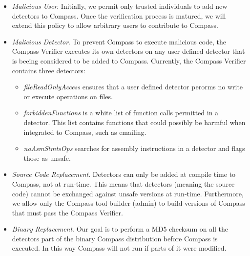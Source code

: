\begin{itemize}
\item \emph{Malicious User}. Initially, we permit only trusted individuals to add new detectors to Compass. Once the verification process
  is matured, we will extend this policy to allow arbitrary users to contribute to Compass. 

\item \emph{Malicious Detector}. To prevent Compass to execute malicious code, the Compass Verifier executes its own detectors on
any user defined detector that is beeing considered to be added to Compass.
Currently, the Compass Verifier contains three detectors:

\begin{itemize}
\item \emph{fileReadOnlyAccess} ensures that a user defined detector perorms no write or execute operations on files. 
\item \emph{forbiddenFunctions} is a white list of function calls permitted in a detector. This list contains functions
that could possibly be harmful when integrated to Compass, such as emailing.
\item \emph{noAsmStmtsOps} searches for assembly instructions in a detector and flags those as unsafe.
\end{itemize}

\item \emph{Source Code Replacement}. Detectors can only be added at compile time to Compass, not at run-time.
This means that detectors (meaning the source code) cannot be exchanged against unsafe versions at run-time. Furthermore, we allow only 
the Compass tool builder (admin) to build versions of Compass that must pass the Compass Verifier.

\item \emph{Binary Replacement}. Our goal is to perform a MD5 checksum on all the detectors part of the binary Compass distribution before
  Compass is executed. In this way Compass will not run if parts of it were modified.
\end{itemize} 





